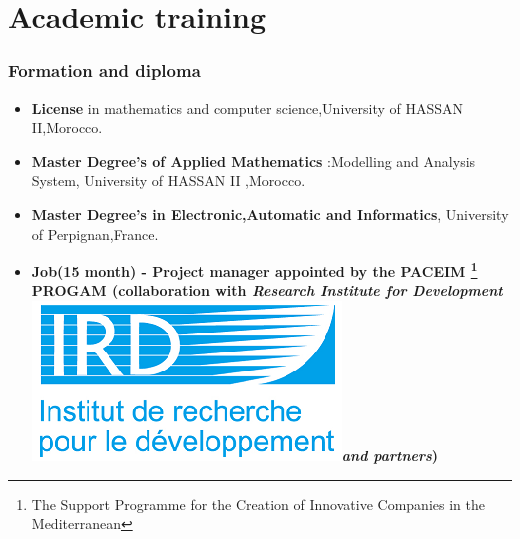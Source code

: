 \documentclass[smaller,brown]{beamer} %
\newcommand{\ird}{\protect\includegraphics[height=4ex,keepaspectratio]{ird.png}}
\begin{document}
\section{Academic training}
\begin{frame}
\frametitle{Formation and diploma}
{\small
\begin{description}
\begin{itemize}
\item <1-| alert@+> [2008/2009 :] {\bf License} in mathematics and computer science,University of HASSAN II,Morocco.
\item <2-| alert@+> [2009/2011 :] {\bf Master Degree's of Applied Mathematics} :Modelling and Analysis System, University of HASSAN II ,Morocco.
\item <3-| alert@+> [2011/2014 :] {\bf Master Degree's in Electronic,Automatic and Informatics}, University of Perpignan,France.
\item <4-| alert@+> [2014/2015 :] {\bf  Job(15 month) - Project manager appointed by the PACEIM \footnote{The Support Programme for the Creation of Innovative Companies in the Mediterranean} PROGAM (collaboration with \textit{Research Institute for Development \ird and partners})}
\end{itemize}
\end{description}}
\end{frame}
\end{document}
